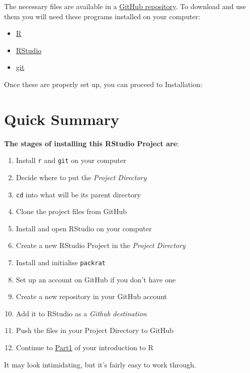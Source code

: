 \documentclass[]{book}
\providecommand{\tightlist}{%
  \setlength{\itemsep}{0pt}\setlength{\parskip}{0pt}}
\theoremstyle{definition}
\theoremstyle{definition}
\theoremstyle{definition}
\theoremstyle{remark}
\begin{document}
The necessary files are available in a
\href{https://github.com/stuzog/Intro2R.git}{GitHub repository}. To
download and use them you will need these programs installed on your
computer:

\begin{itemize}
\tightlist
\item
  \href{https://www.r-project.org/}{R}
\item
  \href{https://www.rstudio.com/products/rstudio/download/}{RStudio}
\item
  \href{https://git-scm.com/book/en/v2/Getting-Started-Installing-Git}{git}
\end{itemize}

Once these are properly set up, you can proceed to Installation:

\hypertarget{quick-summary}{%
\section{Quick Summary}\label{quick-summary}}

\textbf{The stages of installing this RStudio Project are}:

\begin{enumerate}
\def\labelenumi{\arabic{enumi}.}
\tightlist
\item
  Install \texttt{r} and \texttt{git} on your computer
\item
  Decide where to put the \emph{Project Directory}
\item
  \texttt{cd} into what will be its parent directory
\item
  Clone the project files from GitHub
\item
  Install and open RStudio on your computer
\item
  Create a new RStudio Project in the \emph{Project Directory}
\item
  Install and initialise \texttt{packrat}
\item
  Set up an account on GitHub if you don't have one
\item
  Create a new repository in your GitHub account
\item
  Add it to RStudio as a \emph{Github destination}
\item
  Push the files in your Project Directory to GitHub
\item
  Continue to \href{Part1_R_Data_Science.html}{Part1} of your
  introduction to R
\end{enumerate}

It may look intimidating, but it's fairly easy to work through.
\end{document}
